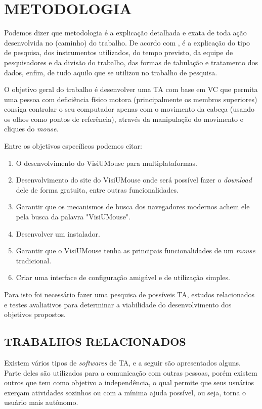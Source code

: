 \chapter{METODOLOGIA}\label{CAP3}

Podemos dizer que metodologia é a explicação detalhada e exata de toda ação desenvolvida no (caminho) do trabalho. De acordo com , é a explicação do tipo de pesquisa, dos instrumentos utilizados, do tempo previsto, da equipe de pesquisadores e da divisão do trabalho, das formas de tabulação e tratamento dos dados, enfim, de tudo aquilo que se utilizou no trabalho de pesquisa.

O objetivo geral do trabalho é desenvolver uma TA com base em VC que permita uma pessoa com deficiência físico motora (principalmente os membros superiores) consiga controlar o seu computador apenas com o movimento da cabeça (usando os olhos como pontos de referência), através da manipulação do movimento e cliques do \textit{mouse}.


Entre os objetivos específicos podemos citar: 
\begin{enumerate}
\item O desenvolvimento do VisiUMouse para multiplataformas.
\item Desenvolvimento do site do VisiUMouse onde será possível fazer o \textit{download} dele de forma gratuita, entre outras funcionalidades.
\item Garantir que os mecanismos de busca dos navegadores modernos achem ele pela busca da palavra "VisiUMouse".
\item Desenvolver um instalador.
\item Garantir que o VisiUMouse tenha as principais funcionalidades de um \textit{mouse} tradicional.
\item Criar uma interface de configuração amigável e de utilização simples.
\end{enumerate}

Para isto foi necessário fazer uma pesquisa de possíveis TA, estudos relacionados e testes avaliativos para determinar a viabilidade do desenvolvimento dos objetivos propostos.
    
\section{TRABALHOS RELACIONADOS}\label{Sub:trabalhos-relacionados}

Existem vários tipos de  \textit{softwares} de TA, e a seguir são apresentados alguns. Parte deles são utilizados para a comunicação com outras pessoas, porém existem outros que tem como objetivo a independência, o qual permite que seus usuários exerçam atividades sozinhos ou com a mínima ajuda possível, ou seja, torna o usuário mais autônomo.

